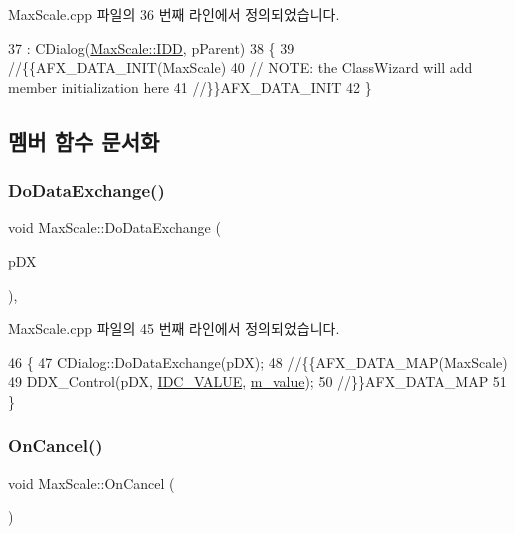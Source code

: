 Max\+Scale.\+cpp 파일의 36 번째 라인에서 정의되었습니다.


\begin{DoxyCode}
37     : CDialog(\mbox{\hyperlink{class_max_scale_a2584d0e001acfcc3d5381fcfa28802d1abe3c08f7c43ce9c923a676f61a12a09e}{MaxScale::IDD}}, pParent)
38 \{
39     \textcolor{comment}{//\{\{AFX\_DATA\_INIT(MaxScale)}
40         \textcolor{comment}{// NOTE: the ClassWizard will add member initialization here}
41     \textcolor{comment}{//\}\}AFX\_DATA\_INIT}
42 \}
\end{DoxyCode}


\subsection{멤버 함수 문서화}
\mbox{\label{class_max_scale_a662145e5302d2f9ecf0beb9cb59badf6}} 
\subsubsection{\texorpdfstring{Do\+Data\+Exchange()}{DoDataExchange()}}
{\footnotesize\ttfamily void Max\+Scale\+::\+Do\+Data\+Exchange (\begin{DoxyParamCaption}\item[{C\+Data\+Exchange $\ast$}]{p\+DX }\end{DoxyParamCaption})\hspace{0.3cm}{\ttfamily [protected]}, {\ttfamily [virtual]}}



Max\+Scale.\+cpp 파일의 45 번째 라인에서 정의되었습니다.


\begin{DoxyCode}
46 \{
47     CDialog::DoDataExchange(pDX);
48     \textcolor{comment}{//\{\{AFX\_DATA\_MAP(MaxScale)}
49     DDX\_Control(pDX, \mbox{\hyperlink{resource_8h_aa862eefddc803e8e65c3253b8029314f}{IDC\_VALUE}}, \mbox{\hyperlink{class_max_scale_a95c50937477be6af50f60f022b5fd4f8}{m\_value}});
50     \textcolor{comment}{//\}\}AFX\_DATA\_MAP}
51 \}
\end{DoxyCode}
\mbox{\label{class_max_scale_a2adeba2f4a8d4371f8c8f301a44c0b3b}} 
\subsubsection{\texorpdfstring{On\+Cancel()}{OnCancel()}}
{\footnotesize\ttfamily void Max\+Scale\+::\+On\+Cancel (\begin{DoxyParamCaption}{ }\end{DoxyParamCaption})\hspace{0.3cm}{\ttfamily [protected]}}




